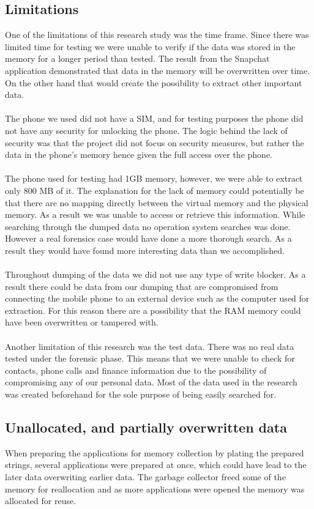 \subsection{Limitations}
One of the limitations of this research study was the time frame. Since there was limited time for testing we were unable to verify if the data was stored in the memory for a longer period than tested. The result from the Snapchat application demonstrated that data in the memory will be overwritten over time. On the other hand that would create the possibility to extract other important data. \\\\
 The phone we used did not have a SIM, and for testing purposes the phone did not have any security for unlocking the phone. The logic behind the lack of security was that the project did not focus on security measures, but rather the data in the phone's memory hence given the full access over the phone. \\\\
The phone used for testing had 1GB memory, however, we were able to extract only 800 MB of it. The explanation for the lack of memory could potentially be that there are no mapping directly between the virtual memory and the physical memory. As a result we was unable to access or retrieve this information. While searching through the dumped data no operation system searches was done. However a real forensics case would have done a more thorough search. As a result they would have found more interesting data than we accomplished. \\\\
Throughout dumping of the data we did not use any type of write blocker. As a result there could be data from our dumping that are compromised from connecting the mobile phone to an external device such as the computer used for extraction. For this reason there are a possibility that the RAM memory could have been overwritten or tampered with. \\\\
Another limitation of this research was the test data. There was no real data tested under the forensic phase. This means that we were unable to check for contacts, phone calls and finance information due to the possibility of compromising any of our personal data. Most of the data used in the research was created beforehand for the sole purpose of being easily searched for. 
\subsection{Unallocated, and partially overwritten data}
When preparing the applications for memory collection by plating the prepared strings, several applications were prepared at once, which could have lead to the later data overwriting earlier data. The garbage collector freed some of the memory for reallocation and as more applications were opened the memory was allocated for reuse.


